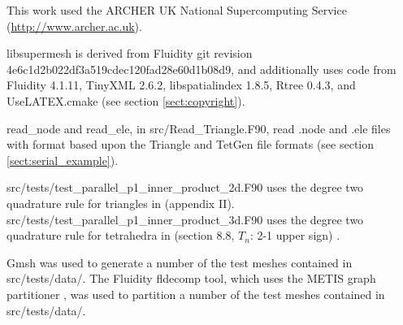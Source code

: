 \documentclass{article}
\begin{document}
This work used the ARCHER UK National Supercomputing Service
(\url{http://www.archer.ac.uk}).

libsupermesh is derived from Fluidity git revision
4e6c1d2b022df3a519cdec120fad28e60d1b08d9, and additionally uses code from
Fluidity 4.1.11, TinyXML 2.6.2, libspatialindex 1.8.5, Rtree 0.4.3, and
UseLATEX.cmake (see section \ref{sect:copyright}).

read\_node and read\_ele, in src/Read\_Triangle.F90, read .node and .ele files
with format based upon the Triangle and TetGen file formats (see section
\ref{sect:serial_example}).

src/tests/test\_parallel\_p1\_inner\_product\_2d.F90 uses the degree two
quadrature rule for triangles in \citet{dunavant1985} (appendix II).
src/tests/test\_parallel\_p1\_inner\_product\_3d.F90 uses the degree two
quadrature rule for tetrahedra in
\citet{stroud1971} (section 8.8, $T_n$: 2-1 upper sign)
\citep[see also][]{hammer1956}.

Gmsh \citep{geuzaine2009} was used to generate a number of the test meshes
contained in src/tests/data/. The Fluidity fldecomp tool, which uses the METIS
graph partitioner \citep{karypis1998}, was used to partition a number of the
test meshes contained in src/tests/data/.



\end{document}
